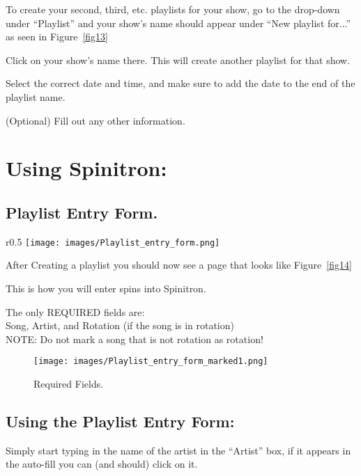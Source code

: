 \documentclass[12pt]{article}
\begin{document}
To create your second, third, etc. playlists for your show, go to the drop-down under ``Playlist'' and your show's name should appear under ``New playlist for...'' as seen in Figure~\ref{fig13}

Click on your show's name there. This will create another playlist for that show.

Select the correct date and time, and make sure to add the date to the end of the playlist name.

(Optional) Fill out any other information.

\clearpage
\newpage

\section{Using Spinitron:}

\subsection{Playlist Entry Form.}

\begin{wrapfigure}{r}{0.5\textwidth}
    \texttt{[image: images/Playlist\_entry\_form.png]}
    \caption{The playlist entry form.}
    \label{fig14}
\end{wrapfigure}


After Creating a playlist you should now see a page that looks like Figure~\ref{fig14}

This is how you will enter spins into Spinitron. 

The only REQUIRED fields are: 
\\
Song, Artist, and Rotation (if the song is in rotation)
\\
NOTE: Do not mark a song that is not rotation as rotation!

\vspace{1cm}

\begin{figure}[h]
    \centering
    \texttt{[image: images/Playlist\_entry\_form\_marked1.png]}
    \caption{Required Fields.}
    \label{fig15}
\end{figure}

\clearpage

\subsection{Using the Playlist Entry Form:}

Simply start typing in the name of the artist in the ``Artist'' box,
if it appears in the auto-fill you can (and should) click on it.
\end{document}
